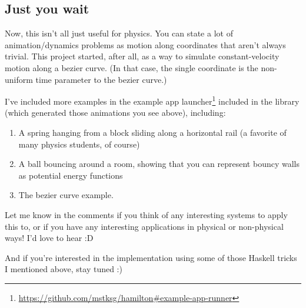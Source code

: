 \documentclass[]{article}
\renewcommand{\href}[2]{#2\footnote{\url{#1}}}
\begin{document}
\hypertarget{just-you-wait}{%
\subsection{Just you wait}\label{just-you-wait}}

Now, this isn't all just useful for physics. You can state a lot of
animation/dynamics problems as motion along coordinates that aren't always
trivial. This project started, after all, as a way to simulate constant-velocity
motion along a bezier curve. (In that case, the single coordinate is the
non-uniform time parameter to the bezier curve.)

I've included more examples in the
\href{https://github.com/mstksg/hamilton\#example-app-runner}{example app
launcher} included in the library (which generated those animations you see
above), including:

\begin{enumerate}
\def\labelenumi{\arabic{enumi}.}
\tightlist
\item
  A spring hanging from a block sliding along a horizontal rail (a favorite of
  many physics students, of course)
\item
  A ball bouncing around a room, showing that you can represent bouncy walls as
  potential energy functions
\item
  The bezier curve example.
\end{enumerate}

Let me know in the comments if you think of any interesting systems to apply
this to, or if you have any interesting applications in physical or non-physical
ways! I'd love to hear :D

And if you're interested in the implementation using some of those Haskell
tricks I mentioned above, stay tuned :)
\end{document}
